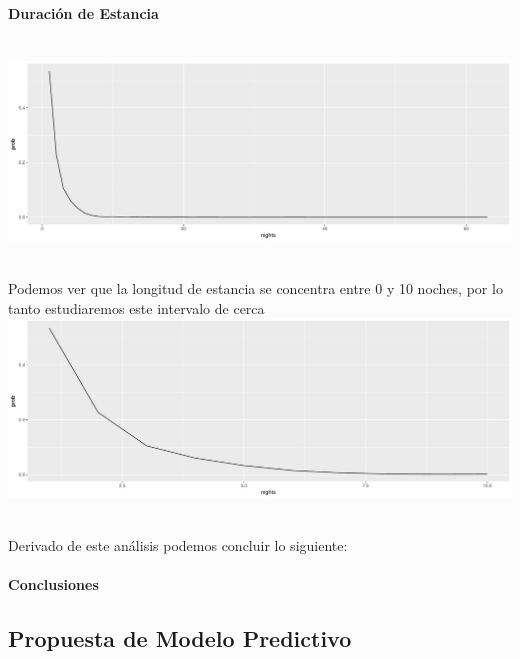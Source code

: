 \documentclass{article}\usepackage[]{graphicx}\usepackage[]{color}
\makeatletter
\def\maxwidth{ %
  \ifdim\Gin@nat@width>\linewidth
    \linewidth
  \else
    \Gin@nat@width
  \fi
}
\newenvironment{knitrout}{}{} %
\makeatother
\begin{document}
\paragraph{Duración de Estancia}~\\
\begin{knitrout}
\color{fgcolor}
\includegraphics[width=\maxwidth]{figures/LOS1-1} 

\end{knitrout}
~\\
Podemos ver que la longitud de estancia se concentra entre 0 y 10 noches, por lo tanto estudiaremos este intervalo de cerca
~\\
\begin{knitrout}
\color{fgcolor}
\includegraphics[width=\maxwidth]{figures/LOS2-1} 

\end{knitrout}
~\\

Derivado de este análisis podemos concluir lo siguiente:
\paragraph{Conclusiones}

\subsection{Propuesta de Modelo Predictivo}
\end{document}
